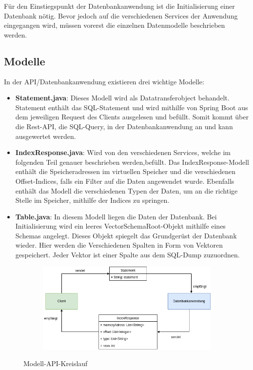 Für den Einstiegspunkt der Datenbankanwendung ist die Initialisierung einer Datenbank nötig. Bevor jedoch auf die verschiedenen Services der Anwendung eingegangen wird, müssen vorerst die einzelnen Datenmodelle beschrieben werden. 

\subsection{Modelle}
\label{Modelle}

In der API/Datenbankanwendung existieren drei wichtige Modelle:

\begin{itemize}
 \item \textbf{Statement.java}: Dieses Modell wird als Datatransferobject behandelt. Statement enthält das SQL-Statement und wird mithilfe von Spring Boot aus dem jeweiligen Request des Clients ausgelesen und befüllt. Somit kommt über die Rest-API, die SQL-Query, in der Datenbankanwendung an und kann ausgewertet werden.
 \item \textbf{IndexResponse.java}: Wird von den verschiedenen Services, welche im folgenden Teil genauer beschrieben werden,befüllt. Das IndexResponse-Modell enthält die Speicheradressen im virtuellen Speicher und die verschiedenen Offset-Indices, falls ein Filter auf die Daten angewendet wurde. Ebenfalls enthält das Modell die verschiedenen Typen der Daten, um an die richtige Stelle im Speicher, mithilfe der Indices zu springen.
 \item \textbf{Table.java}: In diesem Modell liegen die Daten der Datenbank. Bei Initialisierung wird ein leeres VectorSchemaRoot-Objekt mithilfe eines Schemas angelegt. Dieses Objekt spiegelt das Grundgerüst der Datenbank wieder. Hier werden die Verschiedenen Spalten in Form von Vektoren gespeichert. Jeder Vektor ist einer Spalte aus dem SQL-Dump zuzuordnen.
\end{itemize}

\begin{figure}[h]
  \centering
  \begin{subfigure}[b]{1.0\textwidth}
    \includegraphics[width=1.0\linewidth]{img/sendrecieve}
  \end{subfigure}
  \caption{Modell-API-Kreislauf}
  \label{graf_2}
\end{figure}

